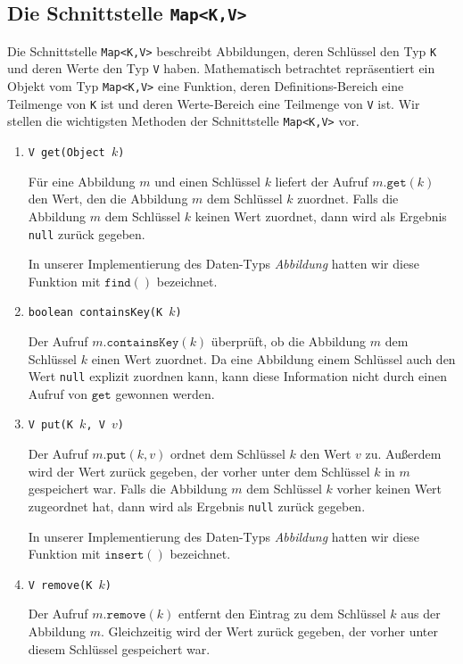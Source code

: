 \subsection{Die Schnittstelle \texttt{Map<K,V>}}
Die Schnittstelle \texttt{Map<K,V>} beschreibt Abbildungen, deren Schl\"ussel den Typ
\texttt{K} und deren Werte den Typ \texttt{V} haben.  Mathematisch betrachtet
repr\"asentiert ein Objekt vom Typ \texttt{Map<K,V>} eine Funktion, deren
Definitions-Bereich eine Teilmenge von \texttt{K} ist und deren Werte-Bereich eine
Teilmenge von \texttt{V} ist.  Wir stellen die wichtigsten Methoden der Schnittstelle
\texttt{Map<K,V>} vor.
\begin{enumerate}
\item \texttt{V get(Object $k$)}
  
      F\"ur eine Abbildung $m$ und einen Schl\"ussel $k$ liefert der Aufruf
      $m.\mathtt{get}(k)$ den Wert, den die Abbildung $m$ dem Schl\"ussel $k$ zuordnet.
      Falls die Abbildung $m$ dem Schl\"ussel $k$ keinen Wert zuordnet, dann wird als
      Ergebnis \texttt{null} zur\"uck gegeben.

      In unserer Implementierung des Daten-Typs \emph{Abbildung} hatten wir diese Funktion
      mit $\texttt{find}()$ bezeichnet.
\item \texttt{boolean containsKey(K $k$)}

      Der Aufruf $m.\mathtt{containsKey}(k)$ \"uberpr\"uft, ob die Abbildung $m$ dem Schl\"ussel
      $k$ einen Wert zuordnet.  Da eine Abbildung einem Schl\"ussel auch den Wert
      \texttt{null} explizit zuordnen kann, kann diese Information nicht durch einen
      Aufruf von $\mathtt{get}$  gewonnen werden.
\item \texttt{V put(K $k$, V $v$)}

      Der Aufruf $m.\mathtt{put}(k,v)$ ordnet dem Schl\"ussel $k$ den Wert $v$ zu.
      Au{\ss}erdem wird der Wert zur\"uck gegeben, der vorher unter dem Schl\"ussel $k$ in $m$
      gespeichert war.  Falls die Abbildung $m$ dem Schl\"ussel $k$ vorher keinen Wert
      zugeordnet hat, dann wird als Ergebnis \texttt{null} zur\"uck gegeben.

      In unserer Implementierung des Daten-Typs \emph{Abbildung} hatten wir diese Funktion
      mit $\texttt{insert}()$ bezeichnet.      
\item \texttt{V remove(K $k$)}
  
      Der Aufruf $m.\mathtt{remove}(k)$ entfernt den Eintrag zu dem Schl\"ussel $k$ aus der Abbildung
      $m$.  Gleichzeitig wird der Wert zur\"uck gegeben, der vorher unter diesem Schl\"ussel
      gespeichert war.
      

\end{enumerate}
